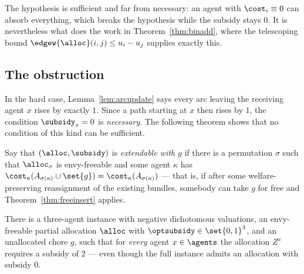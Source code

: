 The hypothesis is sufficient and far from necessary: an agent with
$\cost_i \equiv 0$ can absorb everything, which breaks the hypothesis while the
subsidy stays $0$. It is nevertheless what does the work in
Theorem~\ref{thm:binadd}, where the telescoping bound $\edgew{\alloc}(i,j) \le
u_i - u_j$ supplies exactly this.

\subsection{The obstruction}
\label{sec:obstruction}

In the hard case, Lemma~\ref{lem:arcupdate} says every arc leaving the receiving
agent $x$ rises by exactly $1$. Since a path starting at $x$ then rises by $1$,
the condition $\subsidy_x = 0$ is \emph{necessary}. The following theorem shows
that no condition of this kind can be sufficient.

Say that $(\alloc, \subsidy)$ is \emph{extendable with $g$} if there is a
permutation $\sigma$ such that $\alloc_\sigma$ is envy-freeable and some agent
$\kappa$ has $\cost_\kappa(A_{\sigma(\kappa)} \cup \set{g}) =
\cost_\kappa(A_{\sigma(\kappa)})$ --- that is, if after some welfare-preserving
reassignment of the existing bundles, somebody can take $g$ for free and
Theorem~\ref{thm:freeinsert} applies.

\begin{theorem}
\label{thm:obstruction}
There is a three-agent instance with negative dichotomous valuations, an
envy-freeable partial allocation $\alloc$ with $\optsubsidy \in \set{0,1}^3$,
and an unallocated chore $g$, such that for \emph{every} agent $x \in \agents$
the allocation $Z^x$ requires a subsidy of $2$ --- even though the full instance
admits an allocation with subsidy $0$.
\end{theorem}

